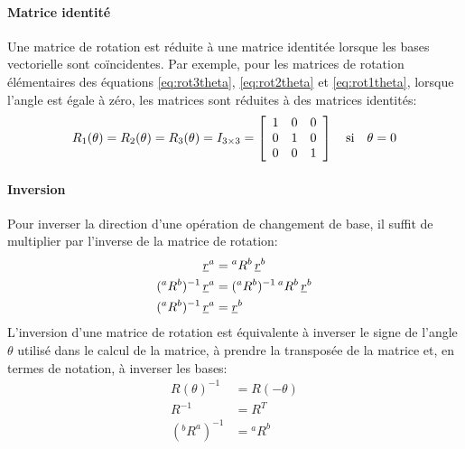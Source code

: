 \paragraph{Matrice identité}
Une matrice de rotation est réduite à une matrice identitée lorsque les bases vectorielle sont coïncidentes. Par exemple, pour les matrices de rotation élémentaires des équations \eqref{eq:rot3theta}, \eqref{eq:rot2theta} et \eqref{eq:rot1theta}, lorsque l'angle est égale à zéro, les matrices sont réduites à des matrices identités:
\begin{align}
R_1( \theta ) = R_2( \theta ) = R_3( \theta ) = I_{3\times3} = 
\left[ \begin{array}{c c c}
	1 & 0 & 0 \\
	0 & 1 & 0 \\
	0 & 0 & 1 
\end{array}  \right]  \quad\text{si}\quad \theta = 0
\label{eq:rot3thetaident}
\end{align}

\paragraph{Inversion}

Pour inverser la direction d'une opération de changement de base, il suffit de multiplier par l'inverse de la matrice de rotation:
\begin{align}
\underline{r}^a &= {}^aR^b \, \underline{r}^b \\
({}^aR^b)^{-1} \, \underline{r}^a &= ({}^aR^b)^{-1} \, {}^aR^b \, \underline{r}^b  \\
({}^aR^b)^{-1} \, \underline{r}^a &= \underline{r}^b
\end{align}
L'inversion d'une matrice de rotation est équivalente à inverser le signe de l'angle $\theta$ utilisé dans le calcul de la matrice, à prendre la transposée de la matrice et, en termes de notation, à inverser les bases:
\begin{align}
R(\theta)^{-1} &= R(-\theta) \\
R^{-1} &= R^T \\
({}^bR^a)^{-1} &= {}^aR^b
\end{align}


